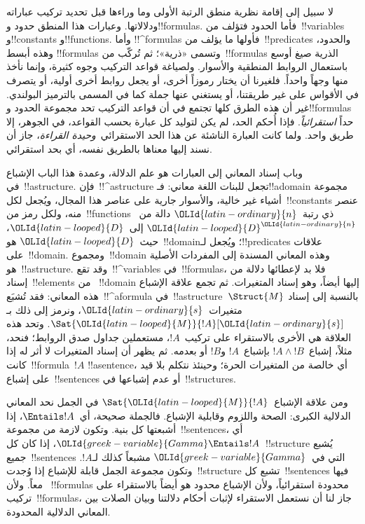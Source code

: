 \documentclass[../../../include/open-logic-section]{subfiles}
\begin{document}


لا سبيل إلى إقامة نظرية منطق الرتبة الأولى وما وراءها قبل تحديد تركيب
عباراته ودلالاتها. وعبارات هذا المنطق حدود و!!{formula}s. فأما الحدود
فتؤلف من~!!{variable}s و!!{constant}s و!!{function}s. وأما
!!^{formula}s فأولها ما يؤلف من~!!{predicate}s والحدود، وهذه أبسط
!!{formula}s وتسمى «ذرية»؛ ثم تُركّب من~!!{formula}s الذرية صيغ أوسع
باستعمال الروابط المنطقية والأسوار. ولصياغة قواعد التركيب وجوه كثيرة،
وإنما نأخذ منها وجهاً واحداً. فلغيرنا أن يختار رموزاً أخرى، أو يجعل
روابط أخرى أولية، أو يتصرف في الأقواس على غير طريقتنا، أو يستغني عنها
جملة كما في المسمى بالترميز البولندي. غير أن هذه الطرق كلها تجتمع في أن
قواعد التركيب تحد مجموعة الحدود و!!{formula}s حداً \emph{استقرائياً}.
فإذا أُحكم الحد، لم يكن لتوليد كل عبارة بحسب القواعد، في الجوهر، إلا طريق
واحد. ولما كانت العبارة الناشئة عن هذا الحد الاستقرائي~\emph{وحيدة
القراءة}، جاز أن نسند إليها معناها بالطريق نفسه، أي بحد استقرائي.

وباب إسناد المعاني إلى العبارات هو علم الدلالة، وعمدة هذا الباب الإشباع
في~!!a{structure}. فإن~!!^a{structure} تجعل للبنات اللغة معاني:
فـ!!a{domain} مجموعة أشياء غير خالية، والأسوار جارية على عناصر هذا
المجال، ويُجعل لكل~!!{constant}s عنصر منه، ولكل رمز من~!!{function}s
ذي رتبة~${\OLId{latin-ordinary}{n}}$ دالة من~${\OLId{latin-looped}{D}}^{\OLId{latin-ordinary}{n}}$ إلى~${\OLId{latin-looped}{D}}$، حيث~${\OLId{latin-looped}{D}}$ هو~!!{domain}؛ ويُجعل
لـ!!{predicate}s علاقات على~!!{domain}. ومجموع~!!{domain} وهذه المعاني
المسندة إلى المفردات الأصلية هو~!!a{structure}. وقد تقع~!!^{variable}s
في~!!{formula}s، فلا بد لإعطائها دلالة من إسناد~!!{element}s من
~!!{domain} إليها أيضاً، وهو إسناد المتغيرات. ثم تجمع علاقة الإشباع هذه
المعاني: فقد تُشبَع~!!^a{formula} في~!!a{structure}~$\Struct{M}$ بالنسبة
إلى إسناد متغيرات~${\OLId{latin-ordinary}{s}}$، ونرمز إلى ذلك بـ$\Sat{{\OLId{latin-looped}{M}}}{!A}[{\OLId{latin-ordinary}{s}}]$. وتحد هذه
العلاقة هي الأخرى بالاستقراء على تركيب~$!A$، مستعملين جداول صدق الروابط؛
فنحد، مثلاً، إشباع~$!A \land !B$ بإشباع~$!A$ و$!B$ أو بعدمه. ثم يظهر أن
إسناد المتغيرات لا أثر له إذا كانت~!!{formula}~$!A$ !!a{sentence}، أي
خالصة من المتغيرات الحرة؛ وحينئذ نتكلم بلا قيد على إشباع~!!{sentence}s
أو عدم إشباعها في~!!{structure}s.

ومن علاقة الإشباع~$\Sat{{\OLId{latin-looped}{M}}}{!A}$ في الجمل نحد المعاني الدلالية الكبرى:
الصحة واللزوم وقابلية الإشباع. فالجملة صحيحة، أي~$\Entails !A$، إذا
أشبعتها كل بنية. وتكون لازمة من مجموعة~!!{sentence}s، أي
${\OLId{greek-variable}{Gamma}} \Entails !A$، إذا كان كل~!!{structure} يُشبع جميع~!!{sentence}s
التي في~${\OLId{greek-variable}{Gamma}}$ مشبعاً كذلك لـ$!A$. وتكون مجموعة الجمل قابلة للإشباع
إذا وُجدت~!!{structure} تشبع كل~!!{sentence}s فيها معاً. ولأن
~!!{formula}s محدودة استقرائياً، ولأن الإشباع محدود هو أيضاً بالاستقراء
على تركيب~!!{formula}s، جاز لنا أن نستعمل الاستقراء لإثبات أحكام دلالتنا
وبيان الصلات بين المعاني الدلالية المحدودة.
\end{document}
